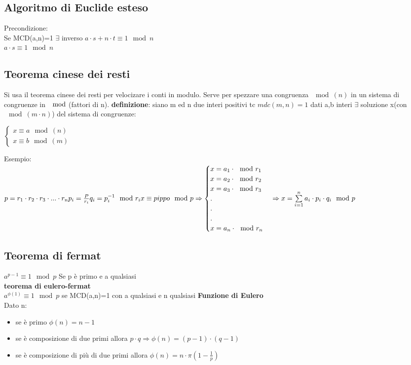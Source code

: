 \documentclass[10pt,a4paper]{article}
\begin{document}
\subsection{Algoritmo di Euclide esteso}
Precondizione:\\
Se MCD(a,n)=1 $\exists$ inverso
$a \cdot s+n \cdot t \equiv 1 \mod n$\\
$a \cdot s \equiv 1 \mod n$

\subsection{Teorema cinese dei resti}
Si usa il teorema cinese dei resti per velocizare i conti in modulo. Serve per spezzare una congruenza $\mod (n)$ in un sistema di congruenze in $\mod$(fattori di n).
\textbf{definizione}: siano m ed n due interi positivi tc $mdc(m,n)=1$ dati a,b interi $\exists$ soluzione x(con $\! \! \! \mod(m\cdot n)$) del sistema di congruenze:

$\begin{cases}
x \equiv a \mod(n) \\
x \equiv b \mod(m)
\end{cases}$

Esempio:\\
$
p= r_1 \cdot r_2 \cdot r_3 \cdot ... \cdot r_n \\
p_i=\frac{P}{r_i} \\
q_i=p_i^{-1} \mod r_i\\
x \equiv pippo \mod p \Rightarrow
\begin{cases}
x=a_1 \cdot \mod r_1 \\
x=a_2 \cdot \mod r_2 \\
x=a_3 \cdot \mod r_3 \\
. \\
. \\
. \\
x=a_n \cdot \mod r_n
\end{cases}
\Rightarrow x= \sum\limits_{i=1}^{n} a_i \cdot p_i \cdot q_i \mod p
$
\subsection{Teorema di fermat}
$a^{p-1} \equiv 1 \mod p$ Se p è primo e a qualsiasi \\
\textbf{teorema di eulero-fermat}\\
$a^{\phi(1)} \equiv 1 \mod p$ se MCD(a,n)=1 con a qualsiasi e n qualsiasi
\textbf{Funzione di Eulero}\\
Dato n:\\
\begin{itemize}
\item se è primo $\phi(n) = n-1$
\item se è composizione di due primi allora $p \cdot q \Rightarrow \phi(n)= (p-1)\cdot (q-1)$
\item se è composizione di più di due primi allora $\phi(n) = n \cdot \pi(1-\frac{1}{p}) $
\end{itemize}
\end{document}
